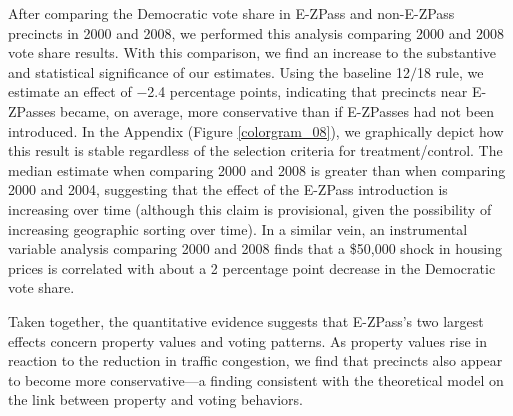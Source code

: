 \documentclass[11.0pt]{article}
\theoremstyle{definition}
\begin{document}
After comparing the Democratic vote share in E-ZPass and non-E-ZPass precincts in 2000 and 2008, we performed this analysis comparing 2000 and 2008 vote share results. With this comparison, we find an increase to the substantive and statistical significance of our estimates. Using the baseline 12$/$18 rule, we estimate an effect of $-$2.4 percentage points, indicating that precincts near E-ZPasses became, on average, more conservative than if E-ZPasses had not been introduced. In the Appendix (Figure \ref{colorgram_08}), we graphically depict how this result is stable regardless of the selection criteria for treatment/control. The median estimate when comparing 2000 and 2008 is greater than when comparing 2000 and 2004, suggesting that the effect of the E-ZPass introduction is increasing over time (although this claim is provisional, given the possibility of increasing geographic sorting over time). In a similar vein, an instrumental variable analysis comparing 2000 and 2008 finds that a \$50,000 shock in housing prices is correlated with about a 2 percentage point decrease in the Democratic vote share. 

Taken together, the quantitative evidence suggests that E-ZPass's two largest effects concern property values and voting patterns. As property values rise in reaction to the reduction in traffic congestion, we find that precincts also appear to become more conservative---a finding consistent with the theoretical model on the link between property and voting behaviors. 
\end{document}
